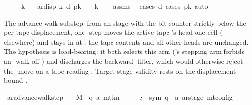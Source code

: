 \begin{isabellebody}
\ \ \ {\isachardoublequoteopen}{}\ {\isacharless}{\kern0pt}\ k{\isachardoublequoteclose}\isanewline
\ \ \ {\isachardoublequoteopen}ar{\isacharunderscore}{\kern0pt}disp\ k\ d\ pk\ {\isasymle}\ {}\ {\isacharasterisk}{\kern0pt}\ k{\isachardoublequoteclose}\isanewline
%
\isadelimproof
\ \ %
\endisadelimproof
%
\isatagproof
{}\isamarkupfalse%
\ assms\ \isamarkupfalse%
\ {\isacharparenleft}{\kern0pt}cases\ d{\isacharsemicolon}{\kern0pt}\ cases\ pk{\isacharparenright}{\kern0pt}\ auto%
\endisatagproof
{\isafoldproof}%
%
\isadelimproof
%
\endisadelimproof
%
\begin{isamarkuptext}%
The advance walk substep: from an  stage with
  the bit-counter strictly below the per-tape displacement, one
  -step moves the active tape 's head one cell
   ( elsewhere) and stays in  at
  ; the tape contents and all other heads are unchanged.
  The  hypothesis is load-bearing: it both selects
  this arm (\isa{{\isasymdelta}}'s stepping arm forbids an -walk off
  ) and discharges the backward- filter, which
  would otherwise reject the -move on a tape reading .
  Target-stage validity rests on the displacement bound
  .%
\end{isamarkuptext}\isamarkuptrue%
\isamarkupfalse%
\ ar{\isacharunderscore}{\kern0pt}advance{\isacharunderscore}{\kern0pt}walk{\isacharunderscore}{\kern0pt}step{\isacharcolon}{\kern0pt}\isanewline
\ \ \ M\ {\isacharcolon}{\kern0pt}{\isacharcolon}{\kern0pt}\ {\isachardoublequoteopen}{\isacharparenleft}{\kern0pt}{\isacharprime}{\kern0pt}q{\isacharcomma}{\kern0pt}\ {\isacharprime}{\kern0pt}a{\isacharparenright}{\kern0pt}\ mttm{\isachardoublequoteclose}\isanewline
\ \ \ \ \ c{\isacharprime}{\kern0pt}\ {\isacharcolon}{\kern0pt}{\isacharcolon}{\kern0pt}\ {\isachardoublequoteopen}{\isacharparenleft}{\kern0pt}sym{}{\isacharcomma}{\kern0pt}\ {\isacharprime}{\kern0pt}q\ {\isasymtimes}\ {\isacharprime}{\kern0pt}a\ ar{\isacharunderscore}{\kern0pt}stage{\isacharparenright}{\kern0pt}\ mt{\isacharunderscore}{\kern0pt}config{\isachardoublequoteclose}\isanewline

\end{isabellebody}
